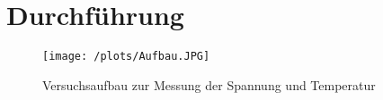 \section{Durchführung}
\label{sec:Durchführung}
\begin{figure}
  \texttt{[image: /plots/Aufbau.JPG]}
  \caption{Versuchsaufbau zur Messung der Spannung und Temperatur}
  \label{fig:aufbau}
\end{figure}
